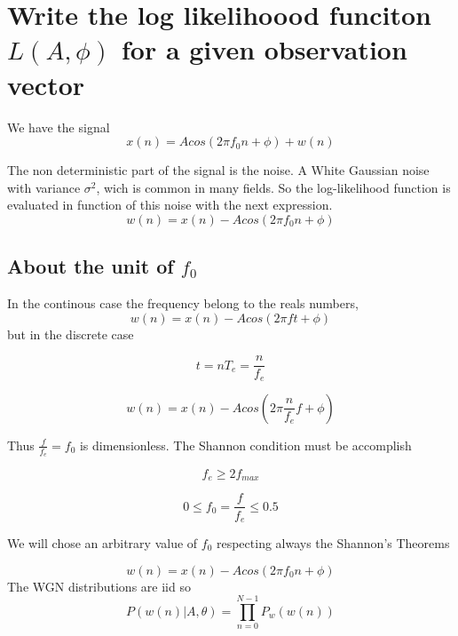 \documentclass{report}
\begin{document}
\section{Write the log likelihoood funciton $L(A,\phi)$ for a given observation vector}
\label{estimationProblem}

We have the signal 
\begin{equation}\label{key}
x(n) = A cos (2\pi f_0 n + \phi) + w(n)
\end{equation}

The non deterministic part of the signal is the noise. A White Gaussian noise with variance $\sigma ^2$, wich is common in many fields. So the log-likelihood function is evaluated in function of this noise with the next expression.
\begin{equation}\label{key}
w(n) = x(n) - A cos (2\pi f_0 n + \phi)
\end{equation}

\subsection{About the unit of $f_0$}

In the continous case the frequency belong to the reals numbers,
\begin{equation}\label{key}
w(n) = x(n) - A cos (2\pi f t + \phi)
\end{equation}
 but in the discrete case 

\begin{equation}\label{key}
t = nT_e = \frac{n}{f_e}
\end{equation}

\begin{equation}\label{key}
w(n) = x(n) - A cos (2\pi \frac{n}{f_e} f + \phi)
\end{equation}

Thus $\frac{f}{f_e} = f_0$ is dimensionless.
The Shannon condition must be accomplish

\begin{equation}\label{key}
f_e \geq 2f_{max}
\end{equation}

\begin{equation}\label{key}
0 \leq f_0 = \frac{f}{f_e} \leq 0.5
\end{equation}

We will chose an arbitrary value of $f_0$ respecting always the Shannon's Theorems




\begin{equation}\label{key}
w(n) = x(n) - A cos (2\pi f_0 n + \phi)
\end{equation}
The WGN distributions are iid so 
\begin{equation}\label{key}
P(w(n)|A,\theta ) = \prod_{n=0}^{N-1} P_w(w(n))
\end{equation}
\end{document}
